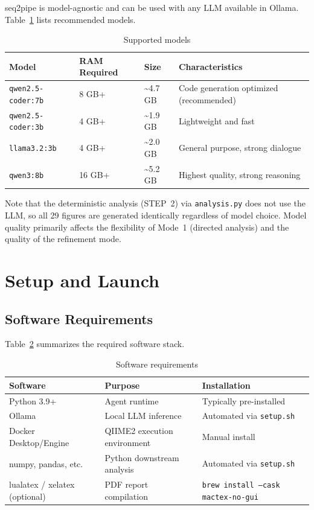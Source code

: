\documentclass[12pt, a4paper]{article}
\begin{document}
seq2pipe is model-agnostic and can be used with any LLM available
in Ollama. Table~\ref{tab:models} lists recommended models.

\begin{table}[h]
  \centering
  \caption{Supported models}
  \label{tab:models}
  \begin{tabular}{llll}
    \toprule
    \textbf{Model} & \textbf{RAM Required} & \textbf{Size} & \textbf{Characteristics} \\
    \midrule
    \texttt{qwen2.5-coder:7b} & 8 GB+ & \textasciitilde4.7 GB &
      Code generation optimized (recommended) \\
    \texttt{qwen2.5-coder:3b} & 4 GB+ & \textasciitilde1.9 GB &
      Lightweight and fast \\
    \texttt{llama3.2:3b}      & 4 GB+ & \textasciitilde2.0 GB &
      General purpose, strong dialogue \\
    \texttt{qwen3:8b}         & 16 GB+ & \textasciitilde5.2 GB &
      Highest quality, strong reasoning \\
    \bottomrule
  \end{tabular}
\end{table}

Note that the deterministic analysis (STEP~2) via \texttt{analysis.py}
does not use the LLM, so all 29 figures are generated identically
regardless of model choice. Model quality primarily affects the flexibility
of Mode~1 (directed analysis) and the quality of the refinement mode.

\section{Setup and Launch}

\subsection{Software Requirements}

Table~\ref{tab:requirements} summarizes the required software stack.

\begin{table}[h]
  \centering
  \caption{Software requirements}
  \label{tab:requirements}
  \begin{tabular}{lll}
    \toprule
    \textbf{Software} & \textbf{Purpose} & \textbf{Installation} \\
    \midrule
    Python 3.9+ & Agent runtime & Typically pre-installed \\
    Ollama & Local LLM inference & Automated via \texttt{setup.sh} \\
    Docker Desktop/Engine & QIIME2 execution environment & Manual install \\
    numpy, pandas, etc. & Python downstream analysis &
      Automated via \texttt{setup.sh} \\
    lualatex / xelatex (optional) & PDF report compilation &
      \texttt{brew install --cask mactex-no-gui} \\
    \bottomrule
  \end{tabular}
\end{table}
\end{document}
